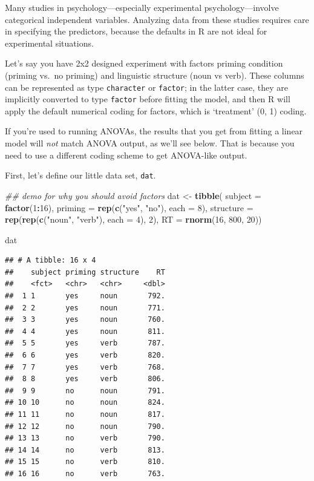 \documentclass[]{book}
\newenvironment{Shaded}{\begin{snugshade}}{\end{snugshade}}
\newcommand{\CommentTok}[1]{\textcolor[rgb]{0.56,0.35,0.01}{\textit{#1}}}
\newcommand{\DataTypeTok}[1]{\textcolor[rgb]{0.13,0.29,0.53}{#1}}
\newcommand{\DecValTok}[1]{\textcolor[rgb]{0.00,0.00,0.81}{#1}}
\newcommand{\KeywordTok}[1]{\textcolor[rgb]{0.13,0.29,0.53}{\textbf{#1}}}
\newcommand{\NormalTok}[1]{#1}
\newcommand{\OperatorTok}[1]{\textcolor[rgb]{0.81,0.36,0.00}{\textbf{#1}}}
\newcommand{\StringTok}[1]{\textcolor[rgb]{0.31,0.60,0.02}{#1}}
\begin{document}
Many studies in psychology---especially experimental psychology---involve categorical independent variables. Analyzing data from these studies requires care in specifying the predictors, because the defaults in R are not ideal for experimental situations.

Let's say you have 2x2 designed experiment with factors priming condition (priming vs.~no priming) and linguistic structure (noun vs verb). These columns can be represented as type \texttt{character} or \texttt{factor}; in the latter case, they are implicitly converted to type \texttt{factor} before fitting the model, and then R will apply the default numerical coding for factors, which is `treatment' (0, 1) coding.

If you're used to running ANOVAs, the results that you get from fitting a linear model will \emph{not} match ANOVA output, as we'll see below. That is because you need to use a different coding scheme to get ANOVA-like output.

First, let's define our little data set, \texttt{dat}.

\begin{Shaded}
\begin{Highlighting}[]
  \CommentTok{## demo for why you should avoid factors}
\NormalTok{  dat <-}\StringTok{ }\KeywordTok{tibble}\NormalTok{(}
    \DataTypeTok{subject =} \KeywordTok{factor}\NormalTok{(}\DecValTok{1}\OperatorTok{:}\DecValTok{16}\NormalTok{),}
    \DataTypeTok{priming =} \KeywordTok{rep}\NormalTok{(}\KeywordTok{c}\NormalTok{(}\StringTok{"yes"}\NormalTok{, }\StringTok{"no"}\NormalTok{), }\DataTypeTok{each =} \DecValTok{8}\NormalTok{),}
    \DataTypeTok{structure =} \KeywordTok{rep}\NormalTok{(}\KeywordTok{rep}\NormalTok{(}\KeywordTok{c}\NormalTok{(}\StringTok{"noun"}\NormalTok{, }\StringTok{"verb"}\NormalTok{), }\DataTypeTok{each =} \DecValTok{4}\NormalTok{), }\DecValTok{2}\NormalTok{),}
    \DataTypeTok{RT =} \KeywordTok{rnorm}\NormalTok{(}\DecValTok{16}\NormalTok{, }\DecValTok{800}\NormalTok{, }\DecValTok{20}\NormalTok{))}

\NormalTok{  dat}
\end{Highlighting}
\end{Shaded}

\begin{verbatim}
## # A tibble: 16 x 4
##    subject priming structure    RT
##    <fct>   <chr>   <chr>     <dbl>
##  1 1       yes     noun       792.
##  2 2       yes     noun       771.
##  3 3       yes     noun       760.
##  4 4       yes     noun       811.
##  5 5       yes     verb       787.
##  6 6       yes     verb       820.
##  7 7       yes     verb       768.
##  8 8       yes     verb       806.
##  9 9       no      noun       791.
## 10 10      no      noun       824.
## 11 11      no      noun       817.
## 12 12      no      noun       790.
## 13 13      no      verb       790.
## 14 14      no      verb       813.
## 15 15      no      verb       810.
## 16 16      no      verb       763.
\end{verbatim}
\end{document}
